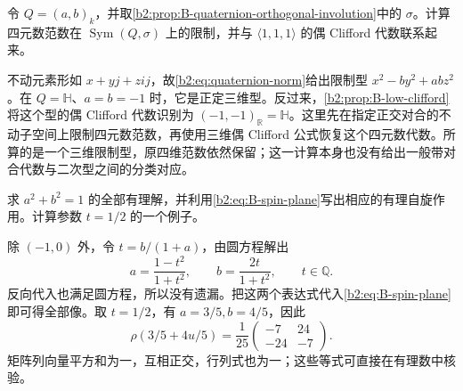 \begin{exercise}\label{b2:ex:B-quaternion-fixed-norm}
	令 \(Q=(a,b)_k\)，并取\cref{b2:prop:B-quaternion-orthogonal-involution}中的 \(\sigma\)。计算四元数范数在 \(\operatorname{Sym}(Q,\sigma)\) 上的限制，并与 \(\langle1,1,1\rangle\) 的偶 Clifford 代数联系起来。
\end{exercise}
\begin{solution}
	不动元素形如 \(x+yj+zij\)，故\eqref{b2:eq:quaternion-norm}给出限制型 \(x^2-by^2+abz^2\)。在 \(Q=\mathbb H\)、\(a=b=-1\) 时，它是正定三维型。反过来，\cref{b2:prop:B-low-clifford}将这个型的偶 Clifford 代数识别为 \((-1,-1)_{\mathbb R}=\mathbb H\)。这里先在指定正交对合的不动子空间上限制四元数范数，再使用三维偶 Clifford 公式恢复这个四元数代数。所算的是一个三维限制型，原四维范数依然保留；这一计算本身也没有给出一般带对合代数与二次型之间的分类对应。
\end{solution}

\begin{exercise}\label{b2:ex:B-rational-spin-parameters}
	求 \(a^2+b^2=1\) 的全部有理解，并利用\eqref{b2:eq:B-spin-plane}写出相应的有理自旋作用。计算参数 \(t=1/2\) 的一个例子。
\end{exercise}
\begin{solution}
	除 \((-1,0)\) 外，令 \(t=b/(1+a)\)，由圆方程解出
	\[
		a=\frac{1-t^2}{1+t^2},\qquad b=\frac{2t}{1+t^2},\qquad t\in\mathbb Q.
	\]
	反向代入也满足圆方程，所以没有遗漏。把这两个表达式代入\eqref{b2:eq:B-spin-plane}即可得全部像。取 \(t=1/2\)，有 \(a=3/5,b=4/5\)，因此
	\[
		\rho(3/5+4u/5)=\frac1{25}\begin{pmatrix}-7&24\\-24&-7\end{pmatrix}.
	\]
	矩阵列向量平方和为一，互相正交，行列式也为一；这些等式可直接在有理数中核验。
\end{solution}

